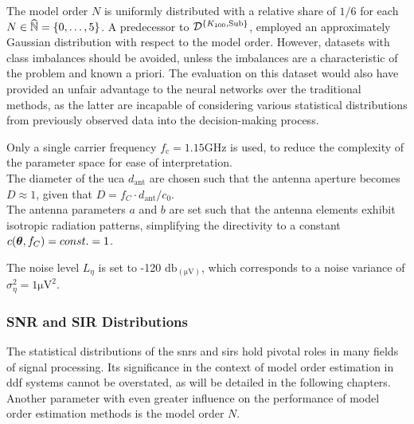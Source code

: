 The model order \( N \) is uniformly distributed with a relative share of \( 1/6 \) for each \( N \in \widehat{\mathbb{N}} = \{0, \ldots, 5\} \).
A predecessor to \( \mathcal{D}^{\{K_{100},\text{Sub}\}} \), employed an approximately Gaussian distribution with respect to the model order.
However, datasets with class imbalances should be avoided, unless the imbalances are a characteristic of the problem and
known a priori. The evaluation on this dataset would also have provided an unfair advantage to the neural networks over
the traditional methods, as the latter are incapable of considering various statistical distributions from previously
observed data into the decision-making process.

Only a single carrier frequency \( f_{\text{c}} = 1.15 \si{\giga\hertz} \) is used, to reduce the complexity of the parameter space for
ease of interpretation. \\
The diameter of the \gls{uca} \( d_{\text{ant}} \) are chosen such that the antenna aperture
becomes \( D \approx 1 \), given that \( D = f_C \cdot d_{\text{ant}} / c_0\).\\
The antenna parameters \( a \) and \( b \) are set such that the antenna elements exhibit isotropic radiation patterns,
simplifying the directivity to a constant \( c(\boldsymbol{\theta}, f_C) = const. = 1 \).

The noise level \( L_{\eta} \) is set to -120 \( \si{\decibel}_{(\si{\micro\volt})} \), which corresponds to a noise variance
of \( \sigma^2_{\eta} = 1 \si{\micro\volt\squared} \).

\newpage{}
\subsubsection{SNR and SIR Distributions}
\label{subsub:snr_sir_distrib}

The statistical distributions of the \glspl{snr} and \glspl{sir} hold pivotal roles in many fields of signal processing.
Its significance in the context of model order estimation in \gls{ddf} systems cannot be overstated, as will be detailed
in the following chapters. \\
Another parameter with even greater influence on the performance of model order estimation methods is the model order \( N \).

